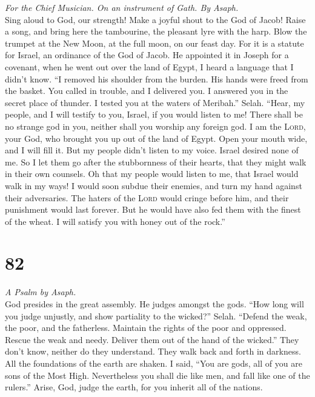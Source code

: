 \emph{For the Chief Musician. On an instrument of Gath. By Asaph.}\\
 Sing aloud to God, our strength! Make a joyful shout to
the God of Jacob!  Raise a song, and bring here the
tambourine, the pleasant lyre with the harp.  Blow the
trumpet at the New Moon, at the full moon, on our feast day.
 For it is a statute for Israel, an ordinance of the God
of Jacob.  He appointed it in Joseph for a covenant, when
he went out over the land of Egypt, I heard a language that I didn't
know.  ``I removed his shoulder from the burden. His hands
were freed from the basket.  You called in trouble, and I
delivered you. I answered you in the secret place of thunder. I tested
you at the waters of Meribah.'' Selah.  ``Hear, my people,
and I will testify to you, Israel, if you would listen to me!
 There shall be no strange god in you, neither shall you
worship any foreign god.  I am the \textsc{Lord}, your
God, who brought you up out of the land of Egypt. Open your mouth wide,
and I will fill it.  But my people didn't listen to my
voice. Israel desired none of me.  So I let them go after
the stubbornness of their hearts, that they might walk in their own
counsels.  Oh that my people would listen to me, that
Israel would walk in my ways!  I would soon subdue their
enemies, and turn my hand against their adversaries.  The
haters of the \textsc{Lord} would cringe before him, and their
punishment would last forever.  But he would have also
fed them with the finest of the wheat. I will satisfy you with honey out
of the rock.''

\hypertarget{section-81}{%
\section{82}\label{section-81}}

\emph{A Psalm by Asaph.}\\
 God presides in the great assembly. He judges amongst the
gods.  ``How long will you judge unjustly, and show
partiality to the wicked?'' Selah.  ``Defend the weak, the
poor, and the fatherless. Maintain the rights of the poor and oppressed.
 Rescue the weak and needy. Deliver them out of the hand
of the wicked.''  They don't know, neither do they
understand. They walk back and forth in darkness. All the foundations of
the earth are shaken.  I said, ``You are gods, all of you
are sons of the Most High.  Nevertheless you shall die
like men, and fall like one of the rulers.''  Arise, God,
judge the earth, for you inherit all of the nations.

